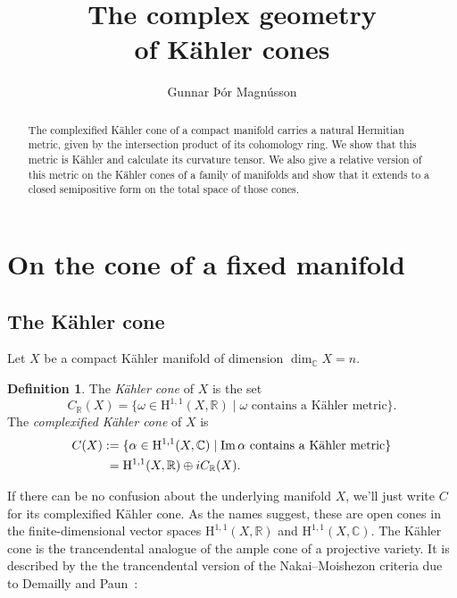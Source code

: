 \documentclass[11pt,a4paper]{amsart}
\title[The complex geometry of K\"{a}hler cones]
{The complex geometry\\of K\"{a}hler cones}
\author{Gunnar Þór Magnússon}
\theoremstyle{definition}
\newtheorem*{defi}{Definition}
\theoremstyle{remark}
\newcommand{\RR}{\mathbb{R}}
\newcommand{\CC}{\mathbb{C}}
\def\Im{\mathop{\rm Im}}
\def\coho#1{\mathrm{H}^{#1}}
\def\kf{\omega}
\def\ckf{\alpha}
\def\KC{C}
\begin{document}
\begin{abstract}
The complexified K\"{a}hler cone of a compact manifold carries a natural
Hermitian metric, given by the intersection product of its cohomology
ring. We show that this metric is K\"{a}hler and calculate its curvature
tensor. We also give a relative version of this metric on the K\"{a}hler
cones of a family of manifolds and show that it extends to a closed
semipositive form on the total space of those cones.
\end{abstract}

\maketitle



\section{On the cone of a fixed manifold}

\subsection*{The K\"{a}hler cone}
Let $X$ be a compact K\"{a}hler manifold of dimension $\dim_{\CC} X = n$.

\begin{defi}
The \emph{K\"{a}hler cone} of $X$ is the set
\begin{equation*}
C_{\RR}(X) = \{ \kf \in \coho{1,1}(X,\RR) 
\mid
\text{$\kf$ contains a K\"{a}hler metric}
\}.
\end{equation*}
The \emph{complexified K\"{a}hler cone} of $X$ is
\begin{align*}
\KC(X) 
&:=
\{ \ckf \in \coho{1,1}(X,\CC) 
\mid
\text{$\Im\ckf$ contains a K\"{a}hler metric}
\}
\\
&\phantom{:}= \coho{1,1}(X,\RR) \oplus i C_{\RR}(X).
\end{align*}
\end{defi}

If there can be no confusion about the underlying manifold $X$, we'll
just write $C$ for its complexified K\"{a}hler cone.
As the names suggest, these are open cones in the finite-dimensional
vector spaces $\coho{1,1}(X,\RR)$ and $\coho{1,1}(X,\CC)$. The K\"{a}hler
cone is the trancendental analogue of the ample cone of a projective
variety. It is described by the the trancendental version of the 
Nakai--Moishezon criteria due to Demailly and Paun~\cite{DemaillyPaun}:
\end{document}
